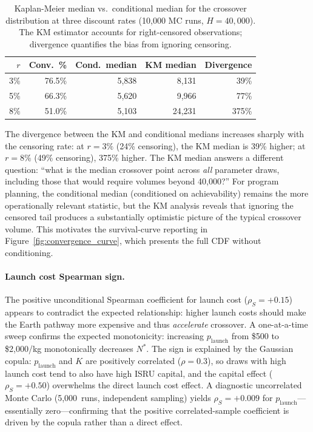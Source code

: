 \documentclass[preprint,12pt]{elsarticle}
\begin{document}
\begin{table}[htbp]
\centering
\caption{Kaplan-Meier median vs.\ conditional median for the crossover distribution at three discount rates (10{,}000 MC runs, $H = 40{,}000$). The KM estimator accounts for right-censored observations; divergence quantifies the bias from ignoring censoring.}
\label{tab:kaplan_meier}
\small
\begin{tabular}{@{}rrrrr@{}}
\toprule
$r$ & Conv.\ \% & Cond.\ median & KM median & Divergence \\
\midrule
3\%  & 76.5\% & 5{,}838 & 8{,}131  & 39\% \\
5\%  & 66.3\% & 5{,}620 & 9{,}966  & 77\% \\
8\%  & 51.0\% & 5{,}103 & 24{,}231 & 375\% \\
\bottomrule
\end{tabular}
\end{table}

The divergence between the KM and conditional medians increases sharply with the censoring rate: at $r = 3\%$ (24\% censoring), the KM median is 39\% higher; at $r = 8\%$ (49\% censoring), 375\% higher. The KM median answers a different question: ``what is the median crossover point across \emph{all} parameter draws, including those that would require volumes beyond 40{,}000?'' For program planning, the conditional median (conditioned on achievability) remains the more operationally relevant statistic, but the KM analysis reveals that ignoring the censored tail produces a substantially optimistic picture of the typical crossover volume. This motivates the survival-curve reporting in Figure~\ref{fig:convergence_curve}, which presents the full CDF without conditioning.

\paragraph{Launch cost Spearman sign.} The positive unconditional Spearman coefficient for launch cost ($\rho_S = +0.15$) appears to contradict the expected relationship: higher launch costs should make the Earth pathway more expensive and thus \emph{accelerate} crossover. A one-at-a-time sweep confirms the expected monotonicity: increasing $p_{\mathrm{launch}}$ from \$500 to \$2{,}000/kg monotonically decreases $N^*$. The sign is explained by the Gaussian copula: $p_{\mathrm{launch}}$ and $K$ are positively correlated ($\rho = 0.3$), so draws with high launch cost tend to also have high ISRU capital, and the capital effect ($\rho_S = +0.50$) overwhelms the direct launch cost effect. A diagnostic uncorrelated Monte Carlo (5{,}000~runs, independent sampling) yields $\rho_S = +0.009$ for $p_{\mathrm{launch}}$---essentially zero---confirming that the positive correlated-sample coefficient is driven by the copula rather than a direct effect.
\end{document}
